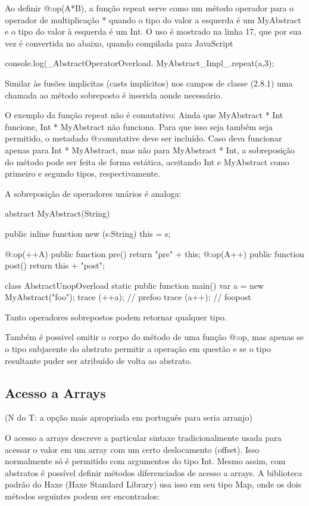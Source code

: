 {{{{Ao definir @:op(A*B), a função repeat serve como um método operador para o operador de multiplicação * quando o tipo do valor a esquerda é um MyAbstract e o tipo do valor à esquerda é um Int. O uso é mostrado na linha 17, que por sua vez é convertida no abaixo, quando compilada para JavaScript

console.log(_AbstractOperatorOverload.
   MyAbstract_Impl_.repeat(a,3);

Similar às fusões implicitas (casts implícitos) nos campos de classe (2.8.1) uma chamada ao método sobreposto é inserida aonde necessário.

O exemplo da função repeat não é comutativo: Ainda que MyAbstract * Int funcione, Int * MyAbstract não funciona. Para que isso seja também seja permitido, o metadado @:comutative deve ser incluído. Caso deva funcionar apenas para Int * MyAbstract, mas não para MyAbstract * Int, a sobreposição do método pode ser feita de forma estática, aceitando Int e MyAbstract como primeiro e segundo tipos, respectivamente.

A sobreposição de operadores unários é analoga:

abstract MyAbstract(String){
    public inline function new (s:String) {
         this = s;
    }

    @:op(++A) public function pre()
       return "pre" + this;
    @:op(A++) public function post()
       return this + "post";
}

class AbstractUnopOverload {
    static public function main() {
       var a = new MyAbstract("foo");
       trace (++a); // prefoo
       trace (a++); // foopost
    }
}

Tanto operadores sobrepostos podem retornar qualquer tipo.

Também é possivel omitir o corpo do método de uma função @:op, mas apenas se o tipo subjacente do abstrato permitir a operação em questão e se o tipo resultante puder ser atribuído de volta ao abstrato.

\subsection{Acesso a Arrays}
(N do T: a opção mais apropriada em português para seria arranjo)

O acesso a arrays descreve a particular sintaxe tradicionalmente usada para acessar o valor em um array com um certo deslocamento (offset). Isso normalmente só é permitido com argumentos do tipo Int. Mesmo assim, com abstratos é possível definir métodos diferenciados de acesso a arrays. A biblioteca padrão do Haxe (Haxe Standard Library) usa  isso em seu tipo Map, onde os dois métodos seguintes podem ser encontrados:

}}}}
